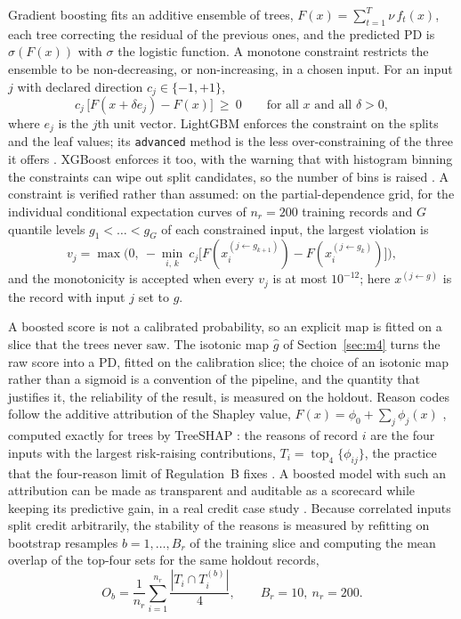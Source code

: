 Gradient boosting fits an additive ensemble of trees, $F(x)=\sum_{t=1}^{T}\nu\,f_t(x)$, each tree correcting the residual of the
previous ones, and the predicted PD is $\sigma(F(x))$ with $\sigma$ the logistic function. A monotone constraint restricts the
ensemble to be non-decreasing, or non-increasing, in a chosen input. For an input $j$ with declared direction $c_j\in\{-1,+1\}$,
\begin{equation}
c_j\,\big[F(x+\delta e_j)-F(x)\big]\ \ge\ 0\qquad\text{for all }x\text{ and all }\delta>0,
\label{eq:cs-mono}
\end{equation}
where $e_j$ is the $j$th unit vector. LightGBM enforces the constraint on the splits and the leaf values; its \texttt{advanced}
method is the less over-constraining of the three it offers \citep{credit-scoring:lightgbmdocs}. XGBoost enforces it too, with the
warning that with histogram binning the constraints can wipe out split candidates, so the number of bins is raised
\citep{credit-scoring:xgboostdocs}. A constraint is verified rather than assumed: on the partial-dependence grid, for the
individual conditional expectation curves of $n_r=200$ training records and $G$ quantile levels $g_1<\dots<g_G$ of each
constrained input, the largest violation is
\begin{equation}
v_j=\max\Big(0,\ -\min_{i,\,k}\ c_j\big[F(x_i^{(j\leftarrow g_{k+1})})-F(x_i^{(j\leftarrow g_{k})})\big]\Big),
\label{eq:cs-pdp}
\end{equation}
and the monotonicity is accepted when every $v_j$ is at most $10^{-12}$; here $x^{(j\leftarrow g)}$ is the record with input $j$
set to $g$.

A boosted score is not a calibrated probability, so an explicit map is fitted on a slice that the trees never saw. The isotonic map
$\hat g$ of Section~\ref{sec:m4} turns the raw score into a PD, fitted on the calibration slice; the choice of an isotonic map
rather than a sigmoid is a convention of the pipeline, and the quantity that justifies it, the reliability of the result, is
measured on the holdout. Reason codes follow the additive attribution of the Shapley value, $F(x)=\phi_0+\sum_j\phi_j(x)$
\citep{credit-scoring:lundberg2017}, computed exactly for trees by TreeSHAP \citep{credit-scoring:lundberg2020}: the reasons of
record $i$ are the four inputs with the largest risk-raising contributions, $T_i=\operatorname{top}_4\{\phi_{ij}\}$, the practice that
the four-reason limit of Regulation~B fixes \citep{credit-scoring:regb}. A boosted model with such an attribution can be made
as transparent and auditable as a scorecard while keeping its predictive gain, in a real credit case study
\citep{credit-scoring:bucker2022}. Because correlated inputs split credit arbitrarily, the
stability of the reasons is measured by refitting on bootstrap resamples $b=1,\dots,B_r$ of the training slice and computing the
mean overlap of the top-four sets for the same holdout records,
\begin{equation}
O_b=\frac1{n_r}\sum_{i=1}^{n_r}\frac{|T_i\cap T_i^{(b)}|}{4},\qquad B_r=10,\ n_r=200.
\label{eq:cs-overlap}
\end{equation}

